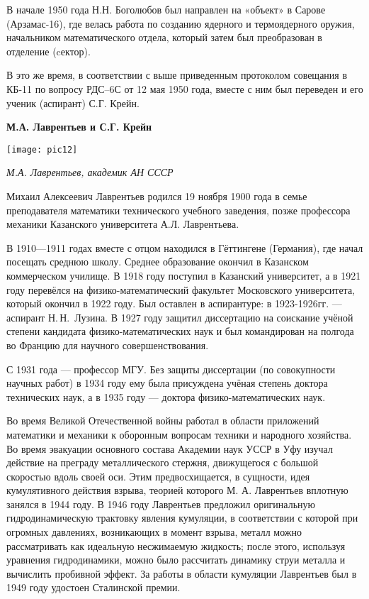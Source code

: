 В начале 1950 года Н.Н. Боголюбов был направлен на «объект» в Сарове (Арзамас-16), где велась работа по созданию ядерного и термоядерного оружия, начальником математического отдела, который затем был преобразован в отделение (cектор).

В это же время, в соответствии с выше приведенным протоколом совещания в КБ-11 по вопросу РДС–6С от 12 мая 1950 года, вместе с ним был переведен и его ученик (аспирант) С.Г. Крейн.

\begin{center}
{\bf М.А. Лаврентьев и С.Г. Крейн}

\vspace{3mm}

\texttt{[image: pic12]}


{\it М.А. Лаврентьев, академик АН СССР}
\end{center}

Михаил Алексеевич Лаврентьев родился 19 ноября 1900 года в семье преподавателя математики технического учебного заведения, позже профессора механики Казанского университета А.Л. Лаврентьева.

В 1910—1911 годах вместе с отцом находился в Гёттингене (Германия), где начал посещать среднюю школу. Среднее образование окончил в Казанском коммерческом училище. В 1918 году поступил в Казанский университет, а в 1921 году перевёлся на физико-математический факультет Московского университета, который окончил в 1922 году. Был оставлен в аспирантуре: в 1923-1926гг. — аспирант Н.\,Н.~Лузина. В 1927 году защитил диссертацию на соискание учёной степени кандидата физико-математических наук и был командирован на полгода во Францию для научного совершенствования.

С 1931 года — профессор МГУ. Без защиты диссертации (по совокупности научных работ) в 1934 году ему была присуждена учёная степень доктора технических наук, а в 1935 году — доктора физико-математических наук.

Во время Великой Отечественной войны  работал в области приложений математики и механики к оборонным вопросам техники и народного хозяйства. Во время эвакуации основного состава Академии наук УССР в Уфу изучал действие на преграду металлического стержня, движущегося с большой скоростью вдоль своей оси. Этим предвосхищается, в сущности, идея кумулятивного действия взрыва, теорией которого М. А. Лаврентьев вплотную занялся в 1944 году. В 1946 году Лаврентьев предложил оригинальную гидродинамическую трактовку явления кумуляции, в соответствии с которой при огромных давлениях, возникающих в момент взрыва, металл можно рассматривать как идеальную несжимаемую жидкость; после этого, используя уравнения гидродинамики, можно было рассчитать динамику струи металла и вычислить пробивной эффект. За работы в области кумуляции Лаврентьев был в 1949 году удостоен Сталинской премии.

